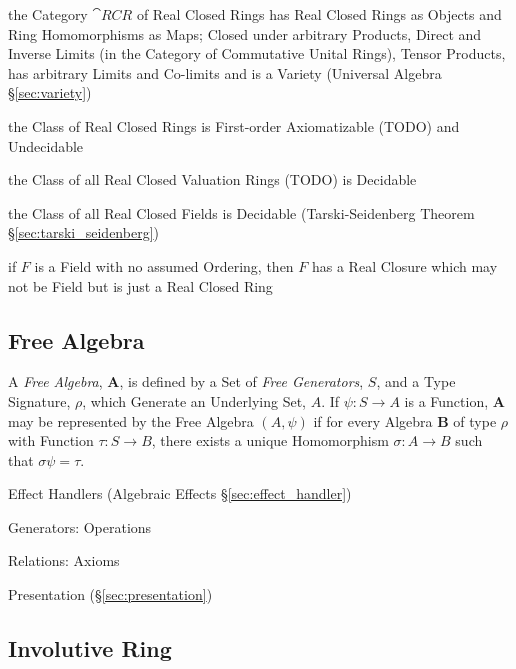 the Category $\cat{RCR}$ of Real Closed Rings has Real Closed Rings as Objects
and Ring Homomorphisms as Maps; Closed under arbitrary Products, Direct and
Inverse Limits (in the Category of Commutative Unital Rings), Tensor Products,
has arbitrary Limits and Co-limits and is a Variety (Universal Algebra
\S\ref{sec:variety})

the Class of Real Closed Rings is First-order Axiomatizable (TODO) and
Undecidable

the Class of all Real Closed Valuation Rings (TODO) is Decidable

the Class of all Real Closed Fields is Decidable (\fist Tarski-Seidenberg
Theorem \S\ref{sec:tarski_seidenberg})

if $F$ is a Field with no assumed Ordering, then $F$ has a Real Closure which
may not be Field but is just a Real Closed Ring



\subsection{Free Algebra}\label{sec:free_algebra}

A \emph{Free Algebra}, $\mathbf{A}$, is defined by a Set of \emph{Free
  Generators}, $S$, and a Type Signature, $\rho$, which Generate an
Underlying Set, $A$. If $\psi : S \rightarrow A$ is a Function,
$\mathbf{A}$ may be represented by the Free Algebra $(A,\psi)$ if for
every Algebra $\mathbf{B}$ of type $\rho$ with Function $\tau : S
\rightarrow B$, there exists a unique Homomorphism $\sigma : A
\rightarrow B$ such that $\sigma\psi = \tau$.

Effect Handlers (Algebraic Effects \S\ref{sec:effect_handler})

Generators: Operations

Relations: Axioms

Presentation (\S\ref{sec:presentation})



\subsection{Involutive Ring}\label{sec:involutive_ring}

